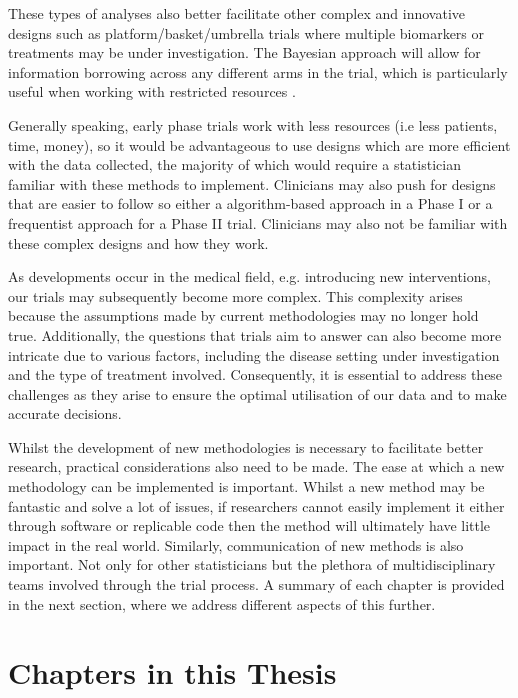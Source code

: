 These types of analyses also better facilitate other complex and innovative designs such as platform/basket/umbrella trials where multiple biomarkers or treatments may be under investigation. The Bayesian approach will allow for information borrowing across any different arms in the trial, which is particularly useful when working with restricted resources \cite{carlinBayesianComplexInnovative2022}. 

Generally speaking, early phase trials work with less resources (i.e less patients, time, money), so it would be advantageous to use designs which are more efficient with the data collected, the majority of which would require a statistician familiar with these methods to implement. Clinicians may also push for designs that are easier to follow so either a algorithm-based approach in a Phase \RN{1} or a frequentist approach for a Phase \RN{2} trial. Clinicians may also not be familiar with these complex designs and how they work. 

As developments occur in the medical field, e.g. introducing new interventions, our trials may subsequently become more complex.  This complexity arises because the assumptions made by current methodologies may no longer hold true. Additionally, the questions that trials aim to answer can also become more intricate due to various factors, including the disease setting under investigation and the type of treatment involved. Consequently, it is essential to address these challenges as they arise to ensure the optimal utilisation of our data and to make accurate decisions. 

Whilst the development of new methodologies is necessary to facilitate better research, practical considerations also need to be made. The ease at which a new methodology can be implemented is important. Whilst a new method may be fantastic and solve a lot of issues, if researchers cannot easily implement it either through software or replicable code then the method will ultimately have little impact in the real world. Similarly, communication of new methods is also important. Not only for other statisticians but the plethora of multidisciplinary teams involved through the trial process. A summary of each chapter is provided in the next section, where we address different aspects of this further. 
\section{Chapters in this Thesis}

